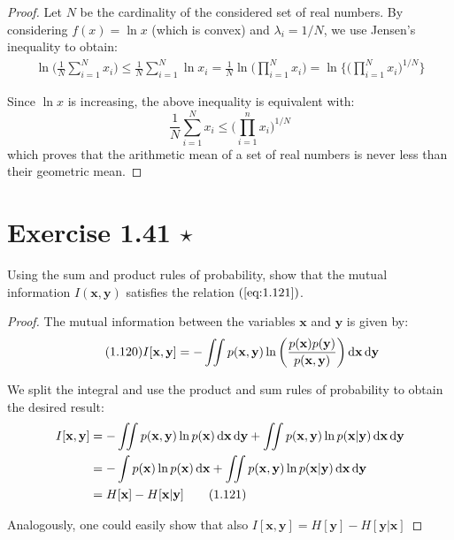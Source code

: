 \begin{proof}
    Let $N$ be the cardinality of the considered set of real numbers. By considering
    $f(x) = \ln x$ (which is convex) and  $\lambda_i = 1/N$, we use Jensen's inequality
    to obtain:
    \begin{align*}
        \ln \bigg(\frac{1}{N} \sum_{i=1}^{N} x_i\bigg) 
        \leq \frac{1}{N} \sum_{i=1}^{N} \ln x_i
        = \frac{1}{N} \ln \bigg(\prod_{i = 1}^N x_i\bigg)
        = \ln \bigg\{\bigg(\prod_{i = 1}^N x_i\bigg)^{1/N}\bigg\}
    \end{align*}

    Since $\ln x$ is increasing, the above inequality is equivalent with:
     \[
         \frac{1}{N} \sum_{i=1}^{N} x_i \leq \bigg({\prod_{i = 1}^n x_i}\bigg)^{1/N}
    \] 
    which proves that the arithmetic mean of a set of real numbers 
    is never less than their geometric mean.
\end{proof}

\section*{Exercise 1.41 $\star$}
Using the sum and product rules of probability, show that the mutual
information $I(\mathbf{x}, \mathbf{y})$ satisfies the relation  $(\ref{eq:1.121})$.

\vspace{1em}

\begin{proof}
    The mutual information between the variables $\mathbf{x}$ and $\mathbf{y}$ is
    given by:
    \begin{equation}\label{eq:1.120}\tag{1.120}
        I[\mathbf{x}, \mathbf{y}] 
        = -\iint p(\mathbf{x}, \mathbf{y}) \ln \bigg(\frac{p(\mathbf{x})p(\mathbf{y})}
        {p(\mathbf{x}, \mathbf{y})}\bigg) \mathop{}\!\mathrm{d} \mathbf{x} \mathop{}\!\mathrm{d} \mathbf{y}
    \end{equation}

    We split the integral and use the product and sum rules of probability to obtain
    the desired result:
    \begin{align*}
        I[\mathbf{x}, \mathbf{y}] 
        &= -\iint p(\mathbf{x}, \mathbf{y}) \ln p(\mathbf{x}) \mathop{}\!\mathrm{d} \mathbf{x} \mathop{}\!\mathrm{d} \mathbf{y}
        + \iint p(\mathbf{x}, \mathbf{y}) \ln p(\mathbf{x} | \mathbf{y}) \mathop{}\!\mathrm{d} \mathbf{x} \mathop{}\!\mathrm{d} \mathbf{y} \\
        &= -\int p(\mathbf{x}) \ln p(\mathbf{x}) \mathop{}\!\mathrm{d} \mathbf{x} 
        + \iint p(\mathbf{x}, \mathbf{y}) \ln p(\mathbf{x} | \mathbf{y}) \mathop{}\!\mathrm{d} \mathbf{x} \mathop{}\!\mathrm{d} \mathbf{y} \\
        &= H[\mathbf{x}] - H[\mathbf{x} | \mathbf{y}] \label{eq:1.121}\tag{1.121}
    \end{align*}

    Analogously, one could easily show that also
    $I[\mathbf{x}, \mathbf{y}] = H[\mathbf{y}] - H[\mathbf{y} | \mathbf{x}]$
\end{proof}
